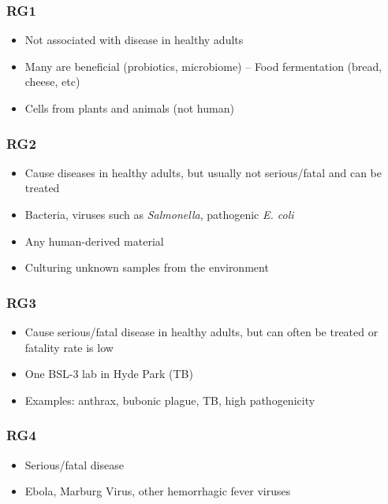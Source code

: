 \documentclass[a4paper, 12pt]{article}
\begin{document}
\subsubsection*{RG1}

\begin{itemize}
\item Not associated with disease in healthy adults
\item Many are beneficial (probiotics, microbiome) -- Food fermentation (bread, cheese, etc)
\item Cells from plants and animals (not human)
\end{itemize}

\subsubsection*{RG2}

\begin{itemize}
\item Cause diseases in healthy adults, but usually not serious/fatal and can be treated
\item Bacteria, viruses such as \textit{Salmonella}, pathogenic \textit{E. coli}
\item Any human-derived material
\item Culturing unknown samples from the environment
\end{itemize}

\subsubsection*{RG3}

\begin{itemize}
\item Cause serious/fatal disease in healthy adults, but can often be treated or fatality rate is low
\item One BSL-3 lab in Hyde Park (TB)
\item Examples: anthrax, bubonic plague, TB, high pathogenicity
\end{itemize}

\subsubsection*{RG4}

\begin{itemize}
\item Serious/fatal disease
\item Ebola, Marburg Virus, other hemorrhagic fever viruses
\end{itemize}
\end{document}
